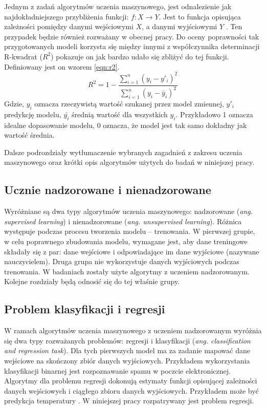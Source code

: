 Jednym z zadań algorytmów uczenia maszynowego, jest odnalezienie jak najdokładniejszego przybliżenia funkcji: $f \colon X \to Y$. 
 Jest to funkcja opisująca zależności pomiędzy danymi wejściowymi $X$, a danymi wyjściowymi $Y$ \cite{ml_supervised}. Ten przypadek będzie również rozważany w obecnej pracy. Do oceny poprawności tak przygotowanych modeli korzysta się między innymi z współczynnika determinacji R-kwadrat ($R^2$) pokazuje on jak bardzo udało się zbliżyć do tej funkcji. Definiowany jest on wzorem \ref{eqn:r2}. 
\begin{equation}
\label{eqn:r2}
R^2=1- \frac{ \sum_{i=1}^{n}(y_i-y'_i)^2}{\sum_{i=1}^{n}(y_i-\bar{y}_i)^2 }
\end{equation}
Gdzie, $y_i$ oznacza rzeczywistą wartość szukanej przez model zmiennej, $y'_i$ predykcję modelu, $\bar{y_i}$ średnią wartość dla wszystkich $y_i$. Przykładowo 1 oznacza idealne dopasowanie modelu, 0 oznacza, że model jest tak samo dokładny jak wartość średnia.\par

Dalsze  podrozdziały wytłumaczenie wybranych zagadnień z zakresu uczenia maszynowego oraz krótki opis algorytmów użytych do badań w niniejszej pracy.

\subsection{Ucznie nadzorowane i nienadzorowane}
Wyróżniane są dwa typy algorytmów uczenia maszynowego: nadzorowane ({\em ang. supervised learning}) i nienadzorowane ({\em ang. unsupervised learning}). Różnica występuje podczas procesu tworzenia modelu -- trenowania. W pierwszej grupie, w celu poprawnego zbudowania modelu, wymagane jest, aby dane treningowe składały się z par: dane wejściowe i odpowiadające im  dane wyjściowe (nazywane nauczycielem). Druga grupa nie wykorzystuje danych wyjściowych podczas trenowania. W badaniach zostały użyte algorytmy z uczeniem nadzorowanym. Kolejne rozdziały będą odnosić się do tej właśnie grupy. \par 

\subsection{Problem klasyfikacji i regresji}
W ramach algorytmów uczenia maszynowego z uczeniem nadzorowanym wyróżnia się dwa typy rozważanych  problemów: regresji i klasyfikacji (\textit{ang. classification and regression task}). Dla tych pierwszych model ma za zadanie mapować dane wejściowe na skończony zbiór danych wyjściowych. Przykładem wykorzystania klasyfikacji binarnej jest rozpoznawanie spamu w poczcie elektronicznej. Algorytmy dla problemu regresji dokonują estymaty funkcji opisującej zależności danych wejściowych i ciągłego zbioru danych wyjściowych. Przykładem może być predykcja temperatury \cite{rf2}.
W niniejszej  pracy rozpatrywany  jest problem regresji. \par



